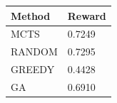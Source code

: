 \begin{tabular}{ll}
\hline
Method & Reward \\
\hline
  MCTS & 0.7249 \\
  RANDOM & 0.7295 \\
  GREEDY & 0.4428 \\
  GA & 0.6910 \\
\hline
\end{tabular}
